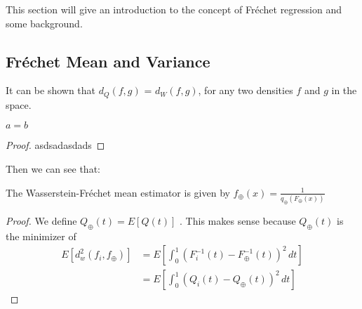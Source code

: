 This section will give an introduction to the concept of Fréchet regression
and some background.

\subsection{Fréchet Mean and Variance}
\label{sec:fr mean and variance}



It can be shown that $d_Q(f,g)$ = $d_W(f,g)$, for any two densities $f$ and $g$ in the
space.
\begin{lemma}
    $a = b$
\end{lemma}
\begin{proof}
    asdsadasdads
\end{proof}

Then we can see that:
\begin{lemma}
    The Wasserstein-Fréchet mean estimator is given by
    $f_\oplus(x) = \frac{1}{q_\oplus(F_\oplus(x))}$
\end{lemma}
\begin{proof}
    We define $Q_\oplus(t) = E[Q(t)]$ \citep[cf.][Ch. 3.1.4]{PanaretosZemel2020}. This
    makes sense because $Q_\oplus(t)$ is the minimizer of
    \begin{equation}
    \label{eq:wf_mean}
        \begin{aligned}
            E[d_w^2(f_i, f_\oplus)]	& =
            E\left[\int_{0}^{1}(F_i^{-1}(t) - F_\oplus^{-1}(t))^2 \,dt\right] \\
                                    & = 
            E\left[\int_{0}^{1}(Q_i(t) - Q_\oplus(t))^2 \,dt\right]
        \end{aligned}
    \end{equation}
\end{proof}